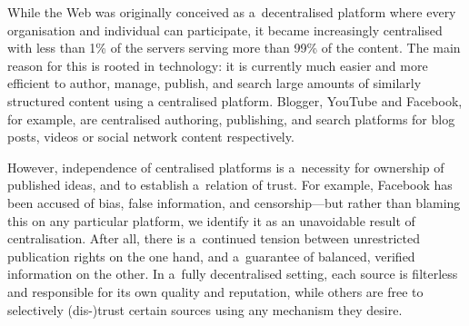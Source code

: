 \documentclass[a4paper]{llncs}
\begin{document}
\par
                                While the Web was originally conceived as a decentralised platform
                                where every organisation and individual can participate,
                                it became increasingly centralised
                                with \empty less than 1\% of the servers serving more than 99\% of the content.
                                The main reason for this is rooted in technology:
                                it is currently much easier and more efficient to author, manage, publish,
                                and search large amounts of similarly structured content using a centralised platform.
                                Blogger, YouTube and Facebook, for example,
                                are centralised authoring, publishing, and search platforms
                                for blog posts, videos or social network content respectively.
                            
                            
\par 
                                However, independence of centralised platforms is a necessity
                                for ownership of published ideas,
                                and to establish a relation of trust.
                                For example, Facebook has been accused of
                                \empty bias,
                                \empty false information,
                                and \empty censorship—but
                                rather than blaming this on any particular platform,
                                we identify it as an unavoidable result of centralisation.
                                After all,
                                there is a continued tension between unrestricted publication rights on the one hand,
                                and a guarantee of balanced, verified information on the other.
                                In a fully decentralised setting, each source is filterless
                                and responsible for its own quality and reputation,
                                while others are free to selectively (dis-)trust certain sources
                                using any mechanism they desire.
                            
\end{document}
